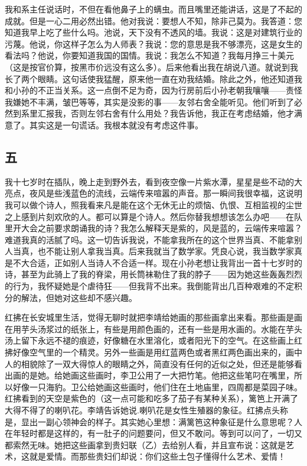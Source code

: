 我和系主任说话时，不但在看他鼻子上的螨虫。而且嘴里还能讲话，这是了不起的成就。但是一心二用必然出错。他对我说：要想人不知，除非己莫为。我答道：您知道我早上吃了些什么吗。池说，天下没有不透风的墙。我说：这是对建筑行业的污蔑。他说，你这样子怎么为人师表？我说：您的意思是我不够漂亮，这是女生的看法吗？他说，你要知道我国的国情。我说：我怎么不知道？我每月挣三十美元（这是按官价算，按黑市价远没有这么多）。后来他看出我在胡说八道。就说到我长了两个眼睛。这句话使我猛醒，原来他一直在劝我结婚。除此之外，他还知道我和小孙的不正当关系。这一点倒不足为奇，因为行房前后小孙老朝我嚷嚷——责怪我嫌她不丰满，皱巴等等，其实是没影的事——友邻右舍全能听见。他们听到了必然到系里汇报我，否则左邻右舍有什么用处？我告诉他，我正在考虑结婚，他才满意了。其实这是一句谎话。我根本就没有考虑这件事。 

\subsection{五} 

我十七岁时在插队，晚上走到野外去，看到夜空像一片紫水潭，星星是些不动的大亮点，夜风是些浅蓝色的流线，云端传来喧嚣的声音。那一瞬间我很幸福，这说明我可以做个诗人，照我看来凡是能在这个无休无止的烦恼、仇恨、互相监视的尘世之上感到片刻欢欣的人。都可以算是个诗人。然后你替我想想该怎么办吧——在队里开大会之前要求朗诵我的诗？我怎么解释天是紫的，风是蓝的，云端传来喧嚣？难道我真的活腻了吗。这一切告诉我说，不能拿我所在的这个世界当真、不能拿别人当真，也不能让别人拿我当真。后来我就当了数学家。凭良心说，我当数学家真是不大合适，正如别人当诗人不合适一样。现在小孙老想让我背出一首十七岁时的诗，甚至为此骑上了我的脊梁，用长筒袜勒住了我的脖子——因为她这些轰轰烈烈的行为，我怀疑她是个虐待狂——但我背不出来。我倒能背出几百种艰难的不定积分的解法，但她对这些却不感兴趣。 

红拂在长安城里生活，觉得无聊时就把李靖给她画的那些画拿出来看。那些画是画在用芋头汤浆过的纸张上，有些是用颜色画的，还有一些是用水画的。水能在芋头汤上留下永远不褪的痕迹，好像糖在水里溶化，或者阳光下的空气。在这些画上红拂好像空气里的一个精灵。另外一些画是用红蓝两色或者黑红两色画出来的，画中人的相貌除了一双大得惊人的眼睛之外，简直没有任何的近似之处，但还是能够看出画的是她。给她画这些画时，李卫公用了一大把竹笔。他把这些笔叼在嘴里，所以好像一只海豹。卫公给她画这些画时，他们住在土地庙里，四周都是菜园子味。红拂看到的天空是紫色的（这一点可能和吃多了茄子有某种关系），篱笆上开满了大得不得了的喇叭花。李靖告诉她说.喇叭花是女性生殖器的象征。红拂点头称是，显出一副心领神会的样子。其实她心里想：满篱笆这种象征是什么意思呢？人在年轻时都是这样的，有一肚子的问题要问，但又不敢问。等到可以问了，一切又都索然无味。她把这些画拿到贵妇联（乙）去给别人看，并且宣布说：这就是艺术，这就是爱情。而那些贵妇们却说：你们这些土包子懂得什么艺术、爱情！ 

